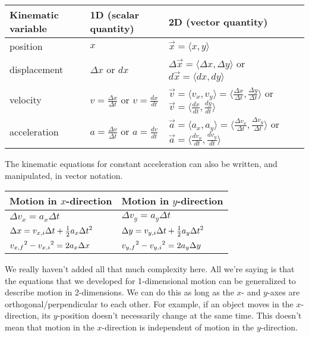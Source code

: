 \begin{table}[h]
\begin{tabular}{lll}
\textbf{Kinematic variable} & \textbf{1D (scalar quantity)} & \textbf{2D (vector quantity)}\\
\hline
position & $x$ & $\vec{x}=\langle{x,y}\rangle$\\
displacement & $\Delta{x}$ or $dx$ & $\Delta\vec{x}=\langle{\Delta{x},\Delta{y}}\rangle$ or $d\vec{x}=\langle{dx,dy}\rangle$\\
velocity & $v=\frac{\Delta{x}}{\Delta{t}}$ or $v=\frac{dx}{dt}$ & $\vec{v}=\langle{v_x,v_y}\rangle=\langle{\frac{\Delta{x}}{\Delta{t}},\frac{\Delta{y}}{\Delta{t}}}\rangle$ or $\vec{v}=\langle{\frac{dx}{dt},\frac{dy}{dt}}\rangle$\\
acceleration & $a=\frac{\Delta{v}}{\Delta{t}}$ or $a=\frac{dv}{dt}$ & $\vec{a}=\langle{a_x,a_y}\rangle=\langle{\frac{\Delta{v_x}}{\Delta{t}},\frac{\Delta{v_y}}{\Delta{t}}}\rangle$ or $\vec{a}=\langle{\frac{dv_x}{dt},\frac{dv_y}{dt}}\rangle$\\
\hline
\end{tabular}
\end{table}

The kinematic equations for constant acceleration can also be written, and manipulated, in vector notation.
\begin{table}[h]
\begin{tabular}{ll}
\textbf{Motion in $x$-direction}\hspace{3cm} & \textbf{Motion in $y$-direction}\\
\hline
$\Delta{v_x}=a_x\Delta{t}$ & $\Delta{v_y}=a_y\Delta{t}$\\
$\Delta{x}=v_{x,i}\Delta{t}+\frac{1}{2}a_x\Delta{t}\displaystyle^2$ & $\Delta{y}=v_{y,i}\Delta{t}+\frac{1}{2}a_y\Delta{t}\displaystyle^2$\\
$v_{x,f}\displaystyle^2-v_{x,i}\displaystyle^2=2a_x\Delta{x}$ & $v_{y,f}\displaystyle^2-v_{y,i}\displaystyle^2=2a_y\Delta{y}$\\
\hline
\end{tabular}
\end{table}

We really haven't added all that much complexity here. All we're saying is that the equations that we developed for 1-dimensional motion can be generalized to describe motion in 2-dimensions. We can do this as long as the $x$- and $y$-axes are orthogonal/perpendicular to each other. For example, if an object moves in the $x$-direction, its $y$-position doesn't necessarily change at the same time. This doesn't mean that motion in the $x$-direction is independent of motion in the $y$-direction. 

